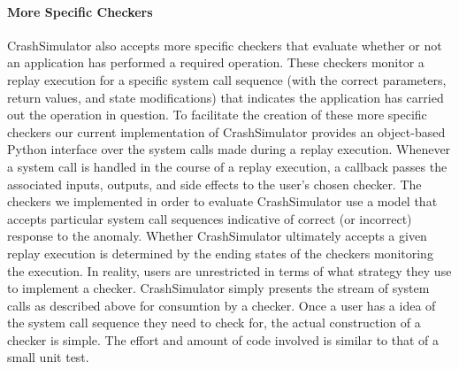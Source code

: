     \paragraph{More Specific Checkers}

    CrashSimulator also accepts more specific checkers that evaluate whether or
    not an application has performed a required operation.  These checkers
    monitor a replay execution for a specific system call sequence (with the
    correct parameters, return values, and state modifications) that indicates
    the application has carried out the operation in question.  To
    facilitate the creation of these more specific checkers our current
    implementation of CrashSimulator provides an object-based Python interface
    over the system calls made during a replay execution.
    Whenever a system call is handled in the course of a replay
    execution, a callback passes the associated inputs, outputs, and side effects to the user's
    chosen checker.  The checkers we implemented in order to evaluate
    CrashSimulator
    use a model that accepts particular system
    call sequences indicative of correct (or incorrect) response
    to the anomaly.  Whether CrashSimulator
    ultimately accepts a given replay execution is determined by the ending
    states of the checkers monitoring the execution.
    In reality,
    users are unrestricted in terms of what strategy they use to implement a
    checker.  CrashSimulator simply presents the stream of system calls as described
    above for consumtion by a checker.  Once a user has a idea of the system call
    sequence they need to check for, the actual construction of a checker is
    simple.  The effort and amount of code involved is similar to that of a small
    unit test.
    


    
